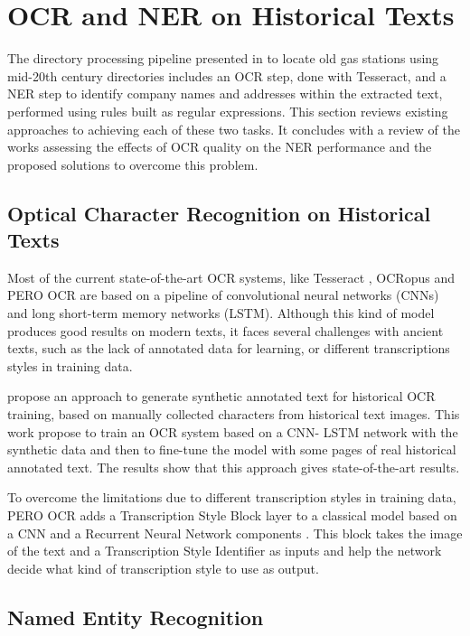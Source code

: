 \section{OCR and NER on Historical Texts}

The directory processing pipeline presented in \cite{bell2020automated} to locate old gas stations using mid-20th century directories includes an OCR step, done with Tesseract, and a NER step to identify company names and addresses within the extracted text, performed using rules built as regular expressions. This section reviews existing approaches to achieving each of these two tasks. It concludes with a review of the works assessing the effects of OCR quality on the NER performance and the proposed solutions to overcome this problem. 

\subsection{Optical Character Recognition on Historical Texts}

Most of the current state-of-the-art OCR systems, like Tesseract \cite{smith2007overview}, OCRopus \cite{breuel2008ocropus} and PERO OCR \cite{kohut2021ts} are based on a pipeline of convolutional neural networks (CNNs) and long short-term memory networks (LSTM). Although this kind of model produces good results on modern texts, it faces several challenges with ancient texts, such as the lack of annotated data for learning, or different transcriptions styles in training data.

\cite{martinek2019hybrid} propose an approach to generate synthetic annotated text for historical OCR training, based on manually collected characters from historical text images. This work propose to train an OCR system based on a CNN-
LSTM network with the synthetic data and then to fine-tune the model with some pages of real historical annotated text. The results show that this approach gives state-of-the-art results. 

To overcome the limitations due to different transcription styles in training data, PERO OCR adds a Transcription Style Block layer to a classical model based on a CNN and a Recurrent Neural Network components \cite{kohut2021ts}. This block takes the image of the text and a Transcription Style Identifier as inputs and help the network decide what kind of transcription style to use as output.

\subsection{Named Entity Recognition}

